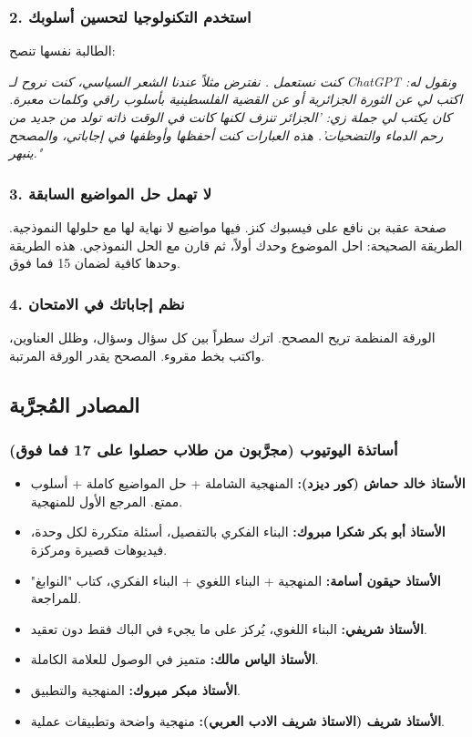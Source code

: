 \documentclass[12pt,a4paper]{book}
\newcommand{\quoteAr}[1]{%
	\begin{myquote}
		\itshape #1
	\end{myquote}
}
\begin{document}
	\subsubsection*{2. استخدم التكنولوجيا لتحسين أسلوبك}
	الطالبة نفسها تنصح: 
	\quoteAr{ كنت نستعمل . نفترض مثلاً عندنا الشعر السياسي، كنت نروح لـ ChatGPT ونقول له: اكتب لي عن الثورة الجزائرية أو عن القضية الفلسطينية بأسلوب راقي وكلمات معبرة. كان يكتب لي جملة زي: 'الجزائر تنزف لكنها كانت في الوقت ذاته تولد من جديد من رحم الدماء والتضحيات'. هذه العبارات كنت أحفظها وأوظفها في إجاباتي، والمصحح ينبهر."
}
	\subsubsection*{3. لا تهمل حل المواضيع السابقة}
	صفحة عقبة بن نافع على فيسبوك كنز. فيها مواضيع لا نهاية لها مع حلولها النموذجية. الطريقة الصحيحة: احل الموضوع وحدك أولاً، ثم قارن مع الحل النموذجي. هذه الطريقة وحدها كافية لضمان 15 فما فوق.
	
	\subsubsection*{4. نظم إجاباتك في الامتحان}
	الورقة المنظمة تريح المصحح. اترك سطراً بين كل سؤال وسؤال، وظلل العناوين، واكتب بخط مقروء. المصحح يقدر الورقة المرتبة.
	
	\subsection{المصادر المُجرَّبة}
	
	\subsubsection*{أساتذة اليوتيوب (مجرَّبون من طلاب حصلوا على 17 فما فوق)}
	
	\begin{itemize}
		\item \textbf{الأستاذ خالد حماش (كور ديزد):} المنهجية الشاملة + حل المواضيع كاملة + أسلوب ممتع. المرجع الأول للمنهجية.
		\item \textbf{الأستاذ أبو بكر شكرا مبروك:} البناء الفكري بالتفصيل، أسئلة متكررة لكل وحدة، فيديوهات قصيرة ومركزة.
		\item \textbf{الأستاذ حيقون أسامة:} المنهجية + البناء اللغوي + البناء الفكري، كتاب "النوابغ" للمراجعة.
		\item \textbf{الأستاذ شريفي:} البناء اللغوي، يُركز على ما يجيء في الباك فقط دون تعقيد.
		\item \textbf{الأستاذ الياس مالك:} متميز في الوصول للعلامة الكاملة.
		\item \textbf{الأستاذ مبكر مبروك:} المنهجية والتطبيق.
		\item \textbf{الأستاذ شريف (الاستاذ شريف الادب العربي):} منهجية واضحة وتطبيقات عملية.
	\end{itemize}
	
\end{document}

